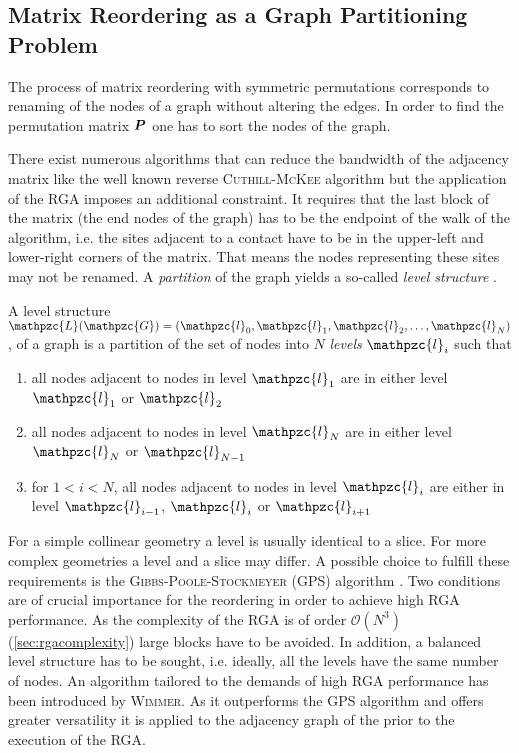 \subsection{Matrix Reordering as a Graph Partitioning Problem}
The process of matrix reordering with symmetric permutations corresponds to renaming of the nodes of a graph without altering the edges. In order to find the permutation matrix $\boldsymbol{P}$ one has to sort the nodes of the graph.\par
There exist numerous algorithms that can reduce the bandwidth of the adjacency matrix like the well known reverse \textsc{Cuthill-McKee} algorithm but the application of the RGA imposes an additional constraint. It requires that the last block of the matrix (the end nodes of the graph) has to be the endpoint of the walk of the algorithm, i.e. the sites adjacent to a contact have to be in the upper-left and lower-right corners of the matrix. That means the nodes representing these sites may not be renamed. A \emph{partition} of the graph yields a so-called \emph{level structure} \cite{gibbs.Siam.13.236}.
\begin{dfn}
A level structure $\mathpzc{L}(\mathpzc{G}) = (\mathpzc{l}_0,\mathpzc{l}_1,\mathpzc{l}_2,\dotsc,\mathpzc{l}_N)$, of a graph  is a partition of the set of nodes  into $N$ \emph{levels} $\mathpzc{l}_i$ such that
\begin{enumerate}
\item all nodes adjacent to nodes in level $\mathpzc{l}_1$ are in either level $\mathpzc{l}_1$ or $\mathpzc{l}_2$
\item all nodes adjacent to nodes in level $\mathpzc{l}_N$ are in either level $\mathpzc{l}_{N}$ or $\mathpzc{l}_{N-1}$
\item for $1 < i < N$, all nodes adjacent to nodes in level $\mathpzc{l}_{i}$ are either in level $\mathpzc{l}_{i-1}$, $\mathpzc{l}_{i}$ or $\mathpzc{l}_{i+1}$
\end{enumerate}
\end{dfn}
For a simple collinear geometry a level is usually identical to a slice. For more complex geometries a level and a slice may differ. A possible choice to fulfill these requirements is the \textsc{Gibbs-Poole-Stockmeyer} (GPS) algorithm \cite{gibbs.Siam.13.236}. Two conditions are of crucial importance for the reordering in order to achieve high RGA performance. As the complexity of the RGA is of order $\mathcal{O}(N^3)$(\cref{sec:rgacomplexity}) large blocks have to be avoided. In addition, a balanced level structure has to be sought, i.e. ideally,  all the levels have the same number of nodes.
An algorithm tailored to the demands of high RGA performance has been introduced by \textsc{Wimmer}. As it outperforms the GPS algorithm and offers greater versatility \cite{Wimmer2009JComPhys} it is applied to the adjacency graph of the \hamil{} prior to the execution of the RGA.
